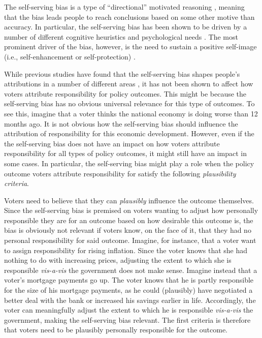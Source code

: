 \documentclass[a4paper,11pt]{article}
\begin{document}
	The self-serving bias is a type of ``directional'' motivated reasoning \citep{kunda1990case}, meaning that the bias leads people to reach conclusions based on some other motive than accuracy. In particular, the self-serving bias has been shown to be driven by a number of different cognitive heuristics  and psychological needs \citep{shepperd2008exploring,snyder1976egotism}. The most prominent driver of the bias, however, is the need to sustain a positive self-image (i.e., self-enhancement or self-protection) \citep{miller1976ego,sedikides2003pancultural}.
	
	
	While previous studies have found that the self-serving bias shapes people's attributions in a number of different areas \citep[e.g.,][]{campbell2000among}, it has not been shown to affect how voters attribute responsibility for policy outcomes. This might be because the self-serving bias has no obvious universal relevance for this type of outcomes. To see this, imagine that a voter thinks the national economy is doing worse than 12 months ago. It is not obvious how the self-serving bias should influence the attribution of responsibility for this economic development. However, even if the the self-serving bias does not have an impact on how voters attribute responsibility for all types of policy outcomes, it might still have an impact in some cases. In particular, the self-serving bias might play a role when the policy outcome voters attribute responsibility for satisfy the following \textit{plausibility criteria}.
	
	Voters need to believe that they can \emph{plausibly} influence the outcome themselves. Since the self-serving bias is premised on voters wanting to adjust how personally responsible they are for an outcome based on how desirable this outcome is, the bias is obviously not relevant if voters know, on the face of it, that they had no personal responsibility for said outcome. Imagine, for instance, that a voter want to assign responsibility for rising inflation. Since the voter knows that she had nothing to do with increasing prices, adjusting the extent to which she is responsible \textit{vis-a-vis} the government does not make sense. Imagine instead that a voter's mortgage payments go up. The voter knows that he is partly responsible for the size of his mortgage payments, as he could (plausibly) have negotiated a better deal with the bank or increased his savings earlier in life. Accordingly, the voter can meaningfully adjust the extent to which he is responsible \textit{vis-a-vis} the government, making the self-serving bias relevant. The first criteria is therefore that voters need to be plausibly personally responsible for the outcome.
	
\end{document}
